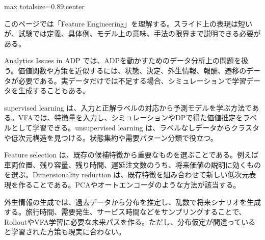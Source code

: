 \begin{minipage}[t]{0.58\textwidth}
\begin{adjustbox}{max totalsize={\textwidth}{0.89\textheight},center}
\begin{minipage}{\textwidth}\scriptsize
{}このページでは「Feature Engineering」を理解する。スライド上の表現は短いが、試験では定義、具体例、モデル上の意味、手法の限界まで説明できる必要がある。\par
Analytics Issues in ADP では、ADPを動かすためのデータ分析上の問題を扱う。価値関数や方策を近似するには、状態、決定、外生情報、報酬、遷移のデータが必要である。実データだけでは不足する場合、シミュレーションで学習データを生成することもある。\par
supervised learning は、入力と正解ラベルの対応から予測モデルを学ぶ方法である。VFAでは、特徴量を入力し、シミュレーションやDPで得た価値推定をラベルとして学習できる。unsupervised learning は、ラベルなしデータからクラスタや低次元構造を見つける。状態集約や需要パターン分類で役立つ。\par
Feature selection は、既存の候補特徴から重要なものを選ぶことである。例えば車両位置、残り容量、残り時間、遅延注文数のうち、将来価値の説明に効くものを選ぶ。Dimensionality reduction は、既存特徴を組み合わせて新しい低次元表現を作ることである。PCAやオートエンコーダのような方法が該当する。\par
外生情報の生成では、過去データから分布を推定し、乱数で将来シナリオを生成する。旅行時間、需要発生、サービス時間などをサンプリングすることで、RolloutやVFA学習に必要な未来パスを作る。ただし、分布仮定が間違っていると学習された方策も現実に合わない。\par

\end{minipage}
\end{adjustbox}
\end{minipage}
